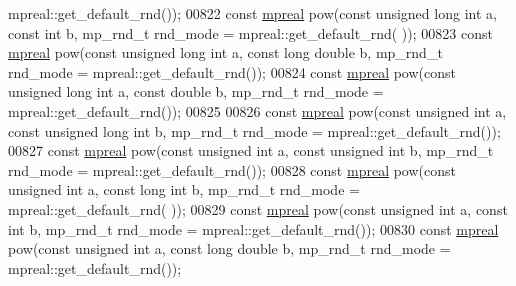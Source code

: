 \begin{DoxyCode}
      mpreal::get\_default\_rnd());
00822 \textcolor{keyword}{const} \hyperlink{classmpfr_1_1mpreal}{mpreal} pow(\textcolor{keyword}{const} \textcolor{keywordtype}{unsigned} \textcolor{keywordtype}{long} \textcolor{keywordtype}{int} a, \textcolor{keyword}{const} \textcolor{keywordtype}{int} b, mp\_rnd\_t rnd\_mode = mpreal::get\_default\_rnd(
      ));
00823 \textcolor{keyword}{const} \hyperlink{classmpfr_1_1mpreal}{mpreal} pow(\textcolor{keyword}{const} \textcolor{keywordtype}{unsigned} \textcolor{keywordtype}{long} \textcolor{keywordtype}{int} a, \textcolor{keyword}{const} \textcolor{keywordtype}{long} \textcolor{keywordtype}{double} b, mp\_rnd\_t rnd\_mode = 
      mpreal::get\_default\_rnd());
00824 \textcolor{keyword}{const} \hyperlink{classmpfr_1_1mpreal}{mpreal} pow(\textcolor{keyword}{const} \textcolor{keywordtype}{unsigned} \textcolor{keywordtype}{long} \textcolor{keywordtype}{int} a, \textcolor{keyword}{const} \textcolor{keywordtype}{double} b, mp\_rnd\_t rnd\_mode = 
      mpreal::get\_default\_rnd());
00825 
00826 \textcolor{keyword}{const} \hyperlink{classmpfr_1_1mpreal}{mpreal} pow(\textcolor{keyword}{const} \textcolor{keywordtype}{unsigned} \textcolor{keywordtype}{int} a, \textcolor{keyword}{const} \textcolor{keywordtype}{unsigned} \textcolor{keywordtype}{long} \textcolor{keywordtype}{int} b, mp\_rnd\_t rnd\_mode = 
      mpreal::get\_default\_rnd());
00827 \textcolor{keyword}{const} \hyperlink{classmpfr_1_1mpreal}{mpreal} pow(\textcolor{keyword}{const} \textcolor{keywordtype}{unsigned} \textcolor{keywordtype}{int} a, \textcolor{keyword}{const} \textcolor{keywordtype}{unsigned} \textcolor{keywordtype}{int} b, mp\_rnd\_t rnd\_mode = 
      mpreal::get\_default\_rnd());
00828 \textcolor{keyword}{const} \hyperlink{classmpfr_1_1mpreal}{mpreal} pow(\textcolor{keyword}{const} \textcolor{keywordtype}{unsigned} \textcolor{keywordtype}{int} a, \textcolor{keyword}{const} \textcolor{keywordtype}{long} \textcolor{keywordtype}{int} b, mp\_rnd\_t rnd\_mode = mpreal::get\_default\_rnd(
      ));
00829 \textcolor{keyword}{const} \hyperlink{classmpfr_1_1mpreal}{mpreal} pow(\textcolor{keyword}{const} \textcolor{keywordtype}{unsigned} \textcolor{keywordtype}{int} a, \textcolor{keyword}{const} \textcolor{keywordtype}{int} b, mp\_rnd\_t rnd\_mode = mpreal::get\_default\_rnd());
00830 \textcolor{keyword}{const} \hyperlink{classmpfr_1_1mpreal}{mpreal} pow(\textcolor{keyword}{const} \textcolor{keywordtype}{unsigned} \textcolor{keywordtype}{int} a, \textcolor{keyword}{const} \textcolor{keywordtype}{long} \textcolor{keywordtype}{double} b, mp\_rnd\_t rnd\_mode = 
      mpreal::get\_default\_rnd());

\end{DoxyCode}
